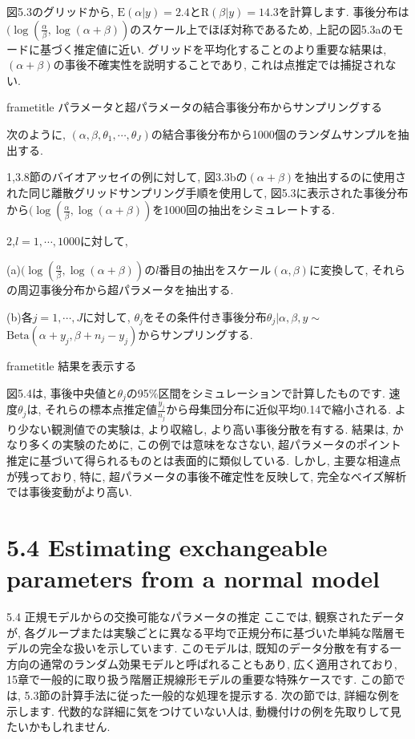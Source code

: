 \documentclass[10pt,dvipdfmx,a4]{beamer}
\newcommand{\dbox}[1]{\begin{beamercolorbox}[wd=122mm, sep=0pt, shadow=false, rounded=false]{frametitle} { #1}\end{beamercolorbox}}
\begin{document}

\begin{frame}
図5.3のグリッドから, $\text{E}(\alpha|y)=2.4$と$\text{R}(\beta|y)=14.3$を計算します.
事後分布は$(\log(\tfrac{\alpha}{\beta},\log(\alpha+\beta))$のスケール上でほぼ対称であるため, 上記の図5.3aのモードに基づく推定値に近い.
グリッドを平均化することのより重要な結果は, $(\alpha+\beta)$の事後不確実性を説明することであり, これは点推定では捕捉されない.

\dbox{パラメータと超パラメータの結合事後分布からサンプリングする}
次のように, $(\alpha,\beta,\theta_1,\cdots,\theta_J)$の結合事後分布から1000個のランダムサンプルを抽出する.

1,3.8節のバイオアッセイの例に対して, 図3.3bの$(\alpha+\beta)$を抽出するのに使用された同じ離散グリッドサンプリング手順を使用して, 図5.3に表示された事後分布から$(\log(\tfrac{\alpha}{\beta}, \log(\alpha+\beta))$を1000回の抽出をシミュレートする.

2,$l=1,\cdots,1000$に対して,

(a)$(\log(\tfrac{\alpha}{\beta}, \log(\alpha+\beta))$の$l$番目の抽出をスケール$(\alpha, \beta)$に変換して, それらの周辺事後分布から超パラメータを抽出する.

(b)各$j=1,\cdots,J$に対して, $\theta_j$をその条件付き事後分布$\theta_j|\alpha,\beta,y\sim$ $\text{Beta}(\alpha+y_j,\beta+n_j-y_j)$からサンプリングする.
\end{frame}


\begin{frame}
\dbox{結果を表示する}
図5.4は, 事後中央値と$\theta_j$の95\%区間をシミュレーションで計算したものです.
速度$\theta_j$は, それらの標本点推定値$\tfrac{y_j}{n_j}$から母集団分布に近似平均0.14で縮小される.
より少ない観測値での実験は, より収縮し, より高い事後分散を有する.
結果は, かなり多くの実験のために, この例では意味をなさない, 超パラメータのポイント推定に基づいて得られるものとは表面的に類似している.
しかし, 主要な相違点が残っており, 特に, 超パラメータの事後不確定性を反映して, 完全なベイズ解析では事後変動がより高い.
\end{frame}

\section{5.4 Estimating exchangeable parameters from a normal model}
\begin{frame}{5.4 正規モデルからの交換可能なパラメータの推定}
ここでは, 観察されたデータが, 各グループまたは実験ごとに異なる平均で正規分布に基づいた単純な階層モデルの完全な扱いを示しています.
このモデルは, 既知のデータ分散を有する一方向の通常のランダム効果モデルと呼ばれることもあり, 広く適用されており, 15章で一般的に取り扱う階層正規線形モデルの重要な特殊ケースです.
この節では, 5.3節の計算手法に従った一般的な処理を提示する.
次の節では, 詳細な例を示します.
代数的な詳細に気をつけていない人は, 動機付けの例を先取りして見たいかもしれません.
\end{frame}
\end{document}

